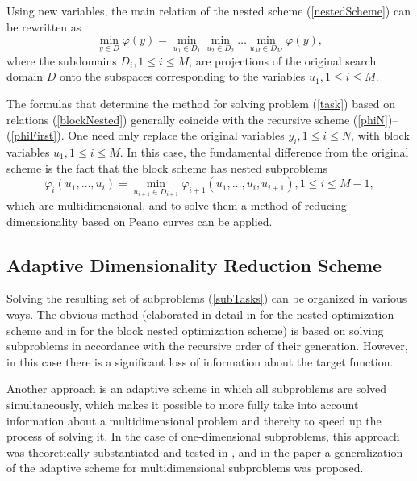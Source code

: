 \documentclass{svproc}
\begin{document}
Using new variables, the main relation of the nested scheme (\ref{nestedScheme}) can be rewritten as
\begin{equation}
\label{blockNested}
\min_{y\in D} \varphi(y)=\min_{u_1\in D_1}\min_{u_2\in D_2}\dots\min_{u_M\in D_M}\varphi(y),
\end{equation}
where the subdomains  \(D_i,1\leqslant i\leqslant M\), are projections of the original search domain \(D\) onto the subspaces corresponding to the variables \(u_1,1\leqslant i\leqslant M\).

The formulas that determine the method for solving problem (\ref{task}) based on relations (\ref{blockNested}) generally coincide with the recursive scheme (\ref{phiN})--(\ref{phiFirst}). One need only replace the original variables  \(y_i,1\leqslant i\leqslant N\), with block variables  \(u_1,1\leqslant i\leqslant M\). 
In this case, the fundamental difference from the original scheme is the fact that the block scheme has nested subproblems
\begin{equation}
\label{subTasks}
\varphi_i(u_1,\dots,u_i)=\min_{u_{i+1}\in D_{i+1}}\varphi_{i+1}(u_1,\dots,u_i,u_{i+1}),1\leqslant i\leqslant M-1,
\end{equation}
which are multidimensional, and to solve them a method of reducing dimensionality based on Peano curves can be applied.

\subsection{Adaptive Dimensionality Reduction Scheme}

Solving the resulting set of subproblems (\ref{subTasks}) can be organized in various ways.
The obvious method (elaborated in detail in \cite{Grishagin2015} for the nested optimization scheme and in \cite{Barkalov2014} for the block nested optimization scheme) is based on solving subproblems in accordance with the recursive order of their generation. However, in this case there is a significant loss of information about the target function.

Another approach is an adaptive scheme in which all subproblems are solved simultaneously, which makes it possible to more fully take into account information about a multidimensional problem and thereby to speed up the process of solving it.
In the case of one-dimensional subproblems, this approach was theoretically substantiated and tested in \cite{Grishagin2016,Grishagin2018}, and in the paper \cite{Barkalov2020} a generalization of the adaptive scheme for multidimensional subproblems was proposed.
\end{document}
